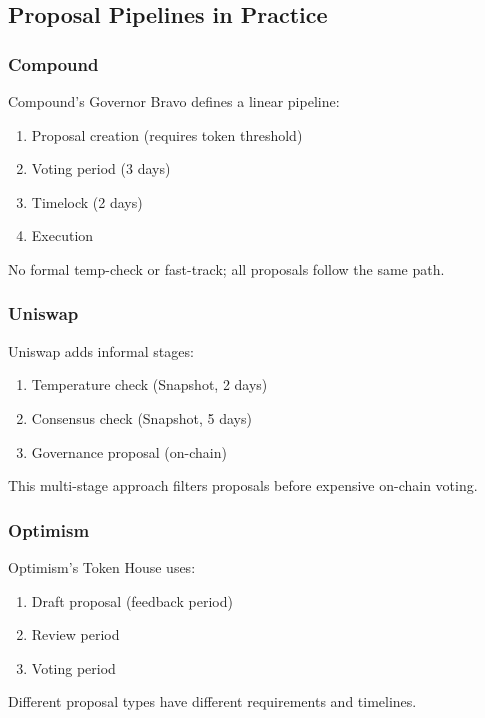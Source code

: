 
\subsection{Proposal Pipelines in Practice}

\subsubsection{Compound}

Compound's Governor Bravo defines a linear pipeline:
\begin{enumerate}
    \item Proposal creation (requires token threshold)
    \item Voting period (3 days)
    \item Timelock (2 days)
    \item Execution
\end{enumerate}

No formal temp-check or fast-track; all proposals follow the same path.

\subsubsection{Uniswap}

Uniswap adds informal stages:
\begin{enumerate}
    \item Temperature check (Snapshot, 2 days)
    \item Consensus check (Snapshot, 5 days)
    \item Governance proposal (on-chain)
\end{enumerate}

This multi-stage approach filters proposals before expensive on-chain voting.

\subsubsection{Optimism}

Optimism's Token House uses:
\begin{enumerate}
    \item Draft proposal (feedback period)
    \item Review period
    \item Voting period
\end{enumerate}

Different proposal types have different requirements and timelines.

